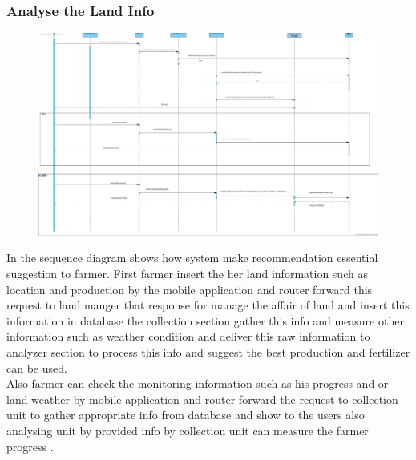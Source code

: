 \subsubsection{Analyse the Land Info}
\begin{figure}[H]
\includegraphics[width=1\textwidth]{figures/RunTimeSequenceDiagram-Page-2.png}
\end{figure}
In the sequence diagram shows how system make recommendation essential suggestion to farmer.
First farmer insert the her land information such as location and production  by the mobile application and router forward  this request to land manger that response for manage the affair of land and insert this information in database the collection section gather this info and measure other information such as weather condition and deliver this raw information to analyzer section  to process this info and suggest the best production and fertilizer can be used.\\
Also farmer can check the monitoring information such as his progress and or land weather  by mobile application and router forward the request to collection unit to gather appropriate info from database and show to the users
also analysing unit by provided info by collection unit can measure the farmer progress .

